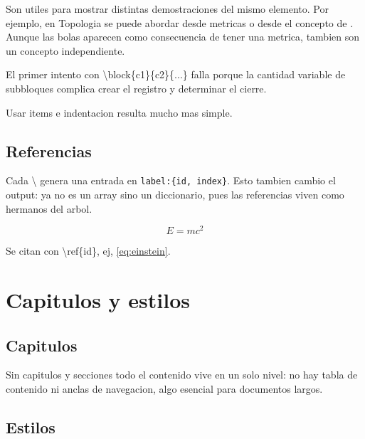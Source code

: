 \documentclass{article}
\begin{document}
  \begin{block}
      \item Son utiles para mostrar distintas demostraciones del mismo elemento.
          Por ejemplo, en Topologia se puede abordar desde metricas o desde el
          concepto de . Aunque las bolas
          aparecen como consecuencia de tener una metrica, tambien son un
          concepto independiente.
      \item El primer intento con \backslash block\{c1\}\{c2\}\{...\} falla
          porque la cantidad variable de subbloques complica crear el registro
          y determinar el cierre.
      \item Usar items e indentacion resulta mucho mas simple.
  \end{block}

  \section{ Referencias }

  Cada \backslash{}
  genera una entrada en \texttt{label:\{id, index\}}.
  Esto tambien cambio el output: ya no es un array sino un diccionario, pues
  las referencias viven como hermanos del arbol.

  \begin{equation}
      E = mc^2
  \end{equation}
  \label{eq:einstein}

  Se citan con \backslash ref\{id\}, ej, \ref{eq:einstein}.

  

  \chapter{ Capitulos y estilos }

  \section{ Capitulos }

  Sin capitulos y secciones todo el contenido vive en un solo nivel: no hay
  tabla de contenido ni anclas de navegacion, algo esencial para documentos largos.

  \section{ Estilos }
\end{document}

